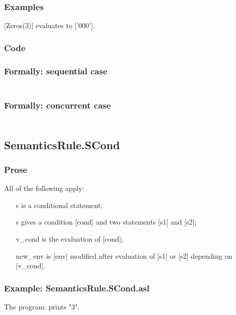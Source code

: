 \documentclass{book}
\begin{document}
    \subsubsection{Examples}
    [Zeros(3)] evaluates to ['000'].

  \subsubsection{Code}

  \subsubsection{Formally: sequential case}
  \begin{align}
  \end{align} 

  \subsubsection{Formally: concurrent case}
  \begin{align}
  \end{align} 

\subsection{SemanticsRule.SCond \label{sec:SemanticsRule.SCond}}

    \subsubsection{Prose}
    All of the following apply:
    \begin{itemize}
    \item [s] is a conditional statement;
    \item [s] gives a condition [cond] and two statements [s1] and [s2];
    \item [v\_cond] is the evaluation of [cond];
    \item [new\_env] is [env] modified after evaluation of [s1] or [s2] depending on
      [v\_cond].
    \end{itemize}

    \subsubsection{Example: SemanticsRule.SCond.asl}
    The program:
    prints "3".
\end{document}
